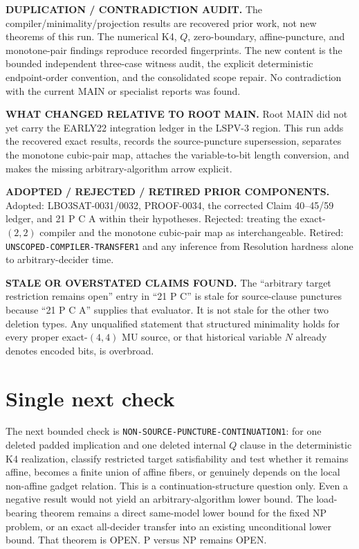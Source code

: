 \documentclass[11pt]{article}
\begin{document}
\textbf{DUPLICATION / CONTRADICTION AUDIT.}
The compiler/minimality/projection results are recovered prior work, not new
theorems of this run.  The numerical K4, $Q$, zero-boundary, affine-puncture,
and monotone-pair findings reproduce recorded fingerprints.  The new content
is the bounded independent three-case witness audit, the explicit deterministic
endpoint-order convention, and the consolidated scope repair.  No contradiction
with the current MAIN or specialist reports was found.

\textbf{WHAT CHANGED RELATIVE TO ROOT MAIN.}
Root MAIN did not yet carry the EARLY22 integration ledger in the LSPV-3
region.  This run adds the recovered exact results, records the source-puncture
supersession, separates the monotone cubic-pair map, attaches the variable-to-bit
length conversion, and makes the missing arbitrary-algorithm arrow explicit.

\textbf{ADOPTED / REJECTED / RETIRED PRIOR COMPONENTS.}
Adopted: LBO3SAT-0031/0032, PROOF-0034, the corrected Claim 40--45/59 ledger,
and 21 P C A within their hypotheses.  Rejected: treating the exact-$(2,2)$
compiler and the monotone cubic-pair map as interchangeable.  Retired:
\texttt{UNSCOPED-COMPILER-TRANSFER1} and any inference from Resolution hardness
alone to arbitrary-decider time.

\textbf{STALE OR OVERSTATED CLAIMS FOUND.}
The ``arbitrary target restriction remains open'' entry in ``21 P C'' is stale
for source-clause punctures because ``21 P C A'' supplies that evaluator.  It
is not stale for the other two deletion types.  Any unqualified statement that
structured minimality holds for every proper exact-$(4,4)$ MU source, or that
historical variable $N$ already denotes encoded bits, is overbroad.

\section{Single next check}

The next bounded check is
\texttt{NON-SOURCE-PUNCTURE-CONTINUATION1}: for one deleted padded implication
and one deleted internal $Q$ clause in the deterministic K4 realization,
classify restricted target satisfiability and test whether it remains affine,
becomes a finite union of affine fibers, or genuinely depends on the local
non-affine gadget relation.  This is a continuation-structure question only.
Even a negative result would not yield an arbitrary-algorithm lower bound.
The load-bearing theorem remains a direct same-model lower bound for the fixed
NP problem, or an exact all-decider transfer into an existing unconditional
lower bound.  That theorem is OPEN.  P versus NP remains OPEN.

\end{document}
